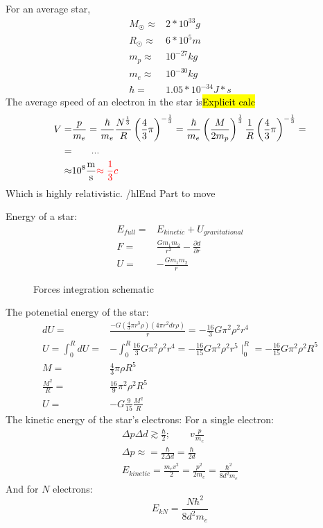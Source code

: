 			For an average star,
			\begin{align}
				M_{\astrosun} \approx& 2*10^{33} \si{g} \\
				R_{\astrosun} \approx& 6*10^5 \si{m} \\
				m_p \approx& 10^{-27} \si{kg} \\
				m_e \approx& 10^{-30} \si{kg} \\
				\hbar =& 1.05 * 10^{-34} \si{J * s}
			\end{align}
			The average speed of an electron in the star is\hl{Explicit calc}
			\begin{align}
				V =& \frac{p}{m_e} = \frac{\hbar}{m_e} \frac{N^{\frac{1}{3}}}{R}\left(\frac{4}{3}\pi\right)^{-\frac{1}{3}} = \frac{\hbar}{m_e} \left( \frac{M}{2m_p}\right)^{\frac{1}{3}}\frac{1}{R}\left(\frac{4}{3}\pi\right)^{-\frac{1}{3}} =\\
				=& \qquad \text{...} \\
				\approx& 10^8 \si{\frac{m}{s}} \hl{\approx \frac{1}{3}c}
			\end{align}
			Which is highly relativistic. /hl{End Part to move}
			
			Energy of a star:
			\begin{align}
				E_{full} =& E_{kinetic} + U_{gravitational} \\
				F =& \frac{G m_1 m_2}{r^2}  - \frac{\partial d}{\partial r} \\
				U =& - \frac{G m_1 m_2}{r}
			\end{align}
		
			\begin{figure}[!h]
				\centering
				
				\caption{Forces integration schematic}
				\label{starintegration}
			\end{figure}
		
			The potenetial energy of the star:
			\begin{align}
				dU =& \frac{-G(\frac{4}{3}\pi r^3 \rho)(4\pi r^2 dr \rho)}{r} = -\frac{16}{3}G\pi^2 \rho^2 r^4 \\
				U = \int_0^R dU =& -\int_0^R\frac{16}{3}G\pi^2 \rho^2 r^4 = -\frac{16}{15}G\pi^2 \rho^2 r^5 \mid_0^R = -\frac{16}{15}G\pi^2 \rho^2 R^5 \\
				M =& \frac{4}{3}\pi\rho R^5 \\
				\frac{M^2}{R} =& \frac{16}{9} \pi^2 \rho^2 R^5 \\
				U =& -G \frac{9}{15} \frac{M^2}{R}
			\end{align}
			The kinetic energy of the star's electrons:
			For a single electron:
			\begin{align}
				\Delta p \Delta d \gtrsim \frac{\hbar}{2}; \qquad v \frac{p}{m_e} \\
				\Delta p \approx = \frac{\hbar}{2 \Delta d} = \frac{\hbar}{2 d} \\
				E_{kinetic} = \frac{m_ev^2}{2} = \frac{p^2}{2m_e} = \frac{\hbar^2}{8d^2m_e}
			\end{align}
			And for $N$ electrons:
			\begin{equation}
				E_{kN} = \frac{N\hbar^2}{8d^2m_e}
				\label{starkinunrel}
			\end{equation}			
			
